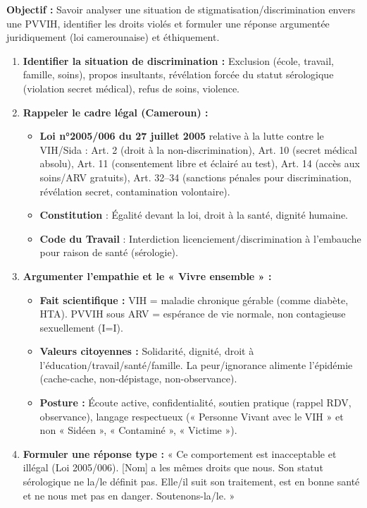 \documentclass[11pt]{article}
\begin{document}
\begin{methode}
\textbf{Objectif :} Savoir analyser une situation de stigmatisation/discrimination envers une PVVIH, identifier les droits violés et formuler une réponse argumentée juridiquement (loi camerounaise) et éthiquement.
\begin{enumerate}
    \item \textbf{Identifier la situation de discrimination :} Exclusion (école, travail, famille, soins), propos insultants, révélation forcée du statut sérologique (violation secret médical), refus de soins, violence.
    \item \textbf{Rappeler le cadre légal (Cameroun) :}
    \begin{itemize}
        \item \textbf{Loi n°2005/006 du 27 juillet 2005} relative à la lutte contre le VIH/Sida : Art. 2 (droit à la non-discrimination), Art. 10 (secret médical absolu), Art. 11 (consentement libre et éclairé au test), Art. 14 (accès aux soins/ARV gratuits), Art. 32--34 (sanctions pénales pour discrimination, révélation secret, contamination volontaire).
        \item \textbf{Constitution} : Égalité devant la loi, droit à la santé, dignité humaine.
        \item \textbf{Code du Travail} : Interdiction licenciement/discrimination à l'embauche pour raison de santé (sérologie).
    \end{itemize}
    \item \textbf{Argumenter l'empathie et le « Vivre ensemble » :}
    \begin{itemize}
        \item \textbf{Fait scientifique :} VIH = maladie chronique gérable (comme diabète, HTA). PVVIH sous ARV = espérance de vie normale, non contagieuse sexuellement (I=I).
        \item \textbf{Valeurs citoyennes :} Solidarité, dignité, droit à l'éducation/travail/santé/famille. La peur/ignorance alimente l'épidémie (cache-cache, non-dépistage, non-observance).
        \item \textbf{Posture :} Écoute active, confidentialité, soutien pratique (rappel RDV, observance), langage respectueux (« Personne Vivant avec le VIH » et non « Sidéen », « Contaminé », « Victime »).
    \end{itemize}
    \item \textbf{Formuler une réponse type :} « Ce comportement est inacceptable et illégal (Loi 2005/006). [Nom] a les mêmes droits que nous. Son statut sérologique ne la/le définit pas. Elle/il suit son traitement, est en bonne santé et ne nous met pas en danger. Soutenons-la/le. »
\end{enumerate}
\end{methode}
\end{document}
